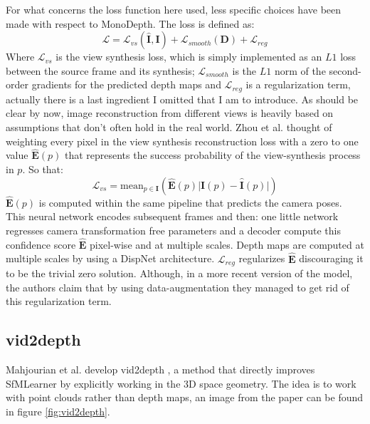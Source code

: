 For what concerns the loss function here used, less specific choices have been made with respect to MonoDepth.
The loss is defined as:
\[
	\mathcal{L} = \mathcal{L}_{vs}(\hat{\mathbf{I}}, \mathbf{I}) + \mathcal{L}_{smooth}(\mathbf{D}) + \mathcal{L}_{reg}
\]
Where $\mathcal{L}_{vs}$ is the view synthesis loss, which is simply implemented as an $L1$ loss between the source frame and its synthesis; $\mathcal{L}_{smooth}$ is the $L1$ norm of the second-order gradients for the predicted depth maps and $\mathcal{L}_{reg}$ is a regularization term, actually there is a last ingredient I omitted that I am to introduce.
As should be clear by now, image reconstruction from different views is heavily based on assumptions that don't often hold in the real world.
Zhou et al. thought of weighting every pixel in the view synthesis reconstruction loss with a zero to one value $\hat{\mathbf{E}}(p)$ that represents the success probability of the view-synthesis process in $p$.
So that:
\[
	\mathcal{L}_{vs} = \text{mean}_{p \in \mathbf{I}}
		\left(
			\hat{\mathbf{E}}(p) \big| \mathbf{I}(p) - \hat{\mathbf{I}}(p) \big|
		\right)
\]
$\hat{\mathbf{E}}(p)$ is computed within the same pipeline that predicts the camera poses.
This neural network encodes subsequent frames and then: one little network regresses camera transformation free parameters and a decoder compute this confidence score $\hat{\mathbf{E}}$ pixel-wise and at multiple scales.
Depth maps are computed at multiple scales by using a DispNet \cite{DispNet} architecture.
$\mathcal{L}_{reg}$ regularizes $\hat{\mathbf{E}}$ discouraging it to be the trivial zero solution.
Although, in a more recent version of the model, the authors claim that by using data-augmentation they managed to get rid of this regularization term.

\subsection{vid2depth}
Mahjourian et al. develop vid2depth \cite{vid2depth}, a method that directly improves SfMLearner by explicitly working in the 3D space geometry.
The idea is to work with point clouds rather than depth maps, an image from the paper can be found in figure \ref{fig:vid2depth}.

